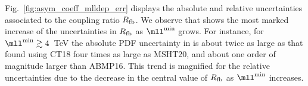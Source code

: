 Fig.~\ref{fig:asym_coeff_mlldep_err} displays the 
absolute  and relative  uncertainties
associated to the coupling ratio $R_{\rm fb}$.
%
We observe that  shows
the most marked increase of the uncertainties in $R_{\rm fb}$
as $\mll^{\rm min}$ grows.
%
For instance, for  $\mll^{\rm min}\gtrsim4$~TeV
the absolute PDF uncertainty in 
is about twice as large as that found using CT18 
four times as large as MSHT20,
and about one order of magnitude larger than ABMP16.
%
This trend is magnified for the relative uncertainties
due to the decrease in the central value of $R_{\rm fb}$
as $\mll^{\rm min}$ increases.
